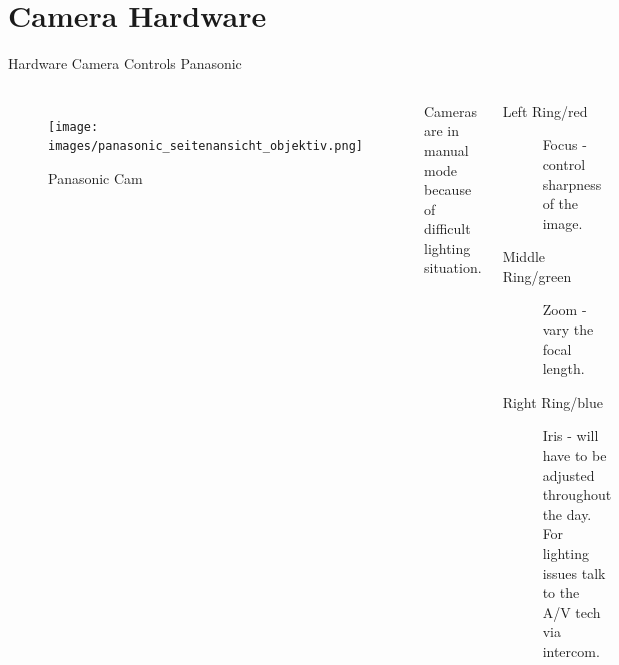 \documentclass[aspectratio=169]{beamer}
\begin{document}



\section{Camera Hardware}
\begin{frame}{Hardware Camera Controls Panasonic}
	\begin{columns}[T,onlytextwidth]
	\begin{figure} 
		\centering
		\texttt{[image: images/panasonic\_seitenansicht\_objektiv.png]}
		\caption{Panasonic Cam}
	\end{figure}
		Cameras are in manual mode because of difficult lighting situation.
		\begin{description}
			\item[Left Ring/red] Focus - control sharpness of the image.
			\item[Middle Ring/green] Zoom - vary the focal length.
			\item[Right Ring/blue] Iris - will have to be adjusted throughout the day. For lighting issues talk to the A/V tech via intercom.
		\end{description}
	\end{columns}
\end{frame}

\end{document}
